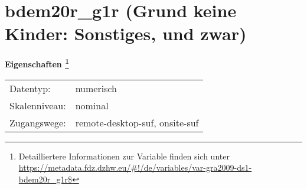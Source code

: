 
    \setcounter{footnote}{0}

    \vspace*{-1.8cm}
	\section{bdem20r\_g1r (Grund keine Kinder: Sonstiges, und zwar)}
	\label{section:bdem20r_g1r}



    \vspace*{0.5cm}
    \noindent\textbf{Eigenschaften
	\footnote{Detailliertere Informationen zur Variable finden sich unter
		\url{https://metadata.fdz.dzhw.eu/\#!/de/variables/var-gra2009-ds1-bdem20r_g1r$}}}\\
	\begin{tabularx}{\hsize}{@{}lX}
	Datentyp: & numerisch \\
	Skalenniveau: & nominal \\
	Zugangswege: &
	  remote-desktop-suf, 
	  onsite-suf
 \\
    \end{tabularx}



